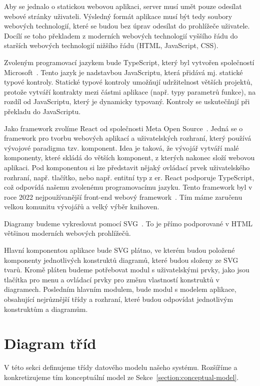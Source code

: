 Aby se jednalo o statickou webovou aplikaci, server musí umět pouze odesílat webové stránky uživateli.
Výsledný formát aplikace musí být tedy soubory webových technologií, které se budou bez úprav odesílat do prohlížeče uživatele.
Docílí se toho překladem z moderních webových technologií vyššího řádu do starších webových technologií nižšího řádu (HTML, JavaScript, CSS).

Zvoleným programovací jazykem bude TypeScript, který byl vytvořen společností Microsoft~\cite{microsoft_typescriptjavascript_2023}.
Tento jazyk je nadstavbou JavaScriptu, která přidává mj. statické typové kontroly.
Statické typové kontroly umožňují udržitelnost větších projektů, protože vytváří kontrakty mezi částmi aplikace (např. typy parametrů funkce), na rozdíl od JavaScriptu, který je dynamicky typovaný.
Kontroly se uskutečňují při překladu do JavaScriptu.

Jako framework zvolíme React od společnosti Meta Open Source~\cite{react_2023}.
Jedná se o framework pro tvorbu webových aplikací a uživatelských rozhraní, který používá vývojové paradigma tzv. komponent.
Idea je taková, že vývojář vytváří malé komponenty, které skládá do větších komponent, z kterých nakonec složí webovou aplikaci.
Pod komponentou si lze představit nějaký ovládací prvek uživatelského rozhraní, např. tlačítko, nebo např. entitní typ z \acrshort{er}.
React podporuje TypeScript, což odpovídá našemu zvolenému programovacímu jazyku.
Tento framework byl v roce 2022 nejpoužívanější front-end webový framework~\cite{stackoverflow_developersurvey_2022}.
Tím máme zaručenu velkou komunitu vývojářů a velký výběr knihoven.

Diagramy budeme vykreslovat pomocí SVG~\cite{brinza_svg_2018}.
To je přímo podporované v HTML většinou moderních webových prohlížečů.

Hlavní komponentou aplikace bude SVG plátno, ve kterém budou položené komponenty jednotlivých konstruktů diagramů, které budou složeny ze SVG tvarů.
Kromě pláten budeme potřebovat modul s uživatelskými prvky, jako jsou tlačítka pro menu a ovládací prvky pro změnu vlastností konstruktů v diagramech.
Posledním hlavním modulem, bude modul s modelem aplikace, obsahující nejrůznější třídy a rozhraní, které budou odpovídat jednotlivým konstruktům a diagramům.

\section{Diagram tříd}

V této sekci definujeme třídy datového modelu našeho systému.
Rozšíříme a konkretizujeme tím konceptuální model ze Sekce~\ref{section:conceptual-model}.

